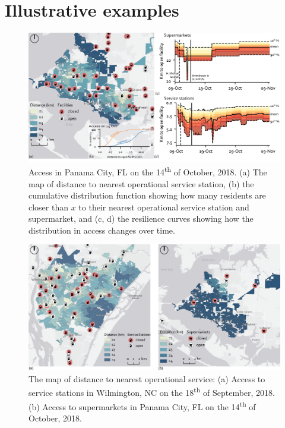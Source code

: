 \documentclass[onecolumn,doublespacing]{risa}
\begin{document}
\section{Illustrative examples}
\begin{figure}
    \centering
    \includegraphics[width=\linewidth]{report/fig/FL_resilience.png}
    \caption{Access in Panama City, FL on the 14\textsuperscript{th} of October, 2018. (a) The map of distance to nearest operational service station, (b) the cumulative distribution function showing how many residents are closer than $x$ to their nearest operational service station and supermarket, and (c, d) the resilience curves showing how the distribution in access changes over time.
    }
    \label{fig:resil_FL}
\end{figure}
\begin{figure}
    \centering
    \includegraphics[width=\linewidth]{report/fig/fig_maps.png}
    \caption{The map of distance to nearest operational service: (a) Access to service stations in Wilmington, NC on the 18\textsuperscript{th} of September, 2018. (b) Access to supermarkets in Panama City, FL on the 14\textsuperscript{th} of October, 2018.
    }
    \label{fig:resil_maps}
\end{figure}
\end{document}
